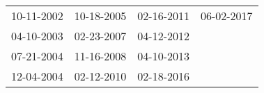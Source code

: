\begin{supertabular}{llll}
 10-11-2002 &  10-18-2005 &  02-16-2011 &  06-02-2017 \\
 04-10-2003 &  02-23-2007 &  04-12-2012 &             \\
 07-21-2004 &  11-16-2008 &  04-10-2013 &             \\
 12-04-2004 &  02-12-2010 &  02-18-2016 &             \\
\end{supertabular}
